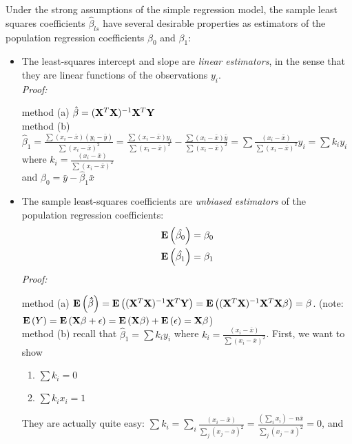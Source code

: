 Under the strong assumptions of the simple regression model, the sample least squares coefficients $\hat{\beta}_{ls}$ have several desirable properties as estimators of the population regression coefficients $\beta_0$ and $\beta_1$:
\begin{itemize}
  \item The least-squares intercept and slope are {\it linear estimators}, in the sense that they are linear functions of the observations $y_i$.
  \\
  {\it Proof:\\} 
  \begin{pf}
  method (a) $\hat{\beta} = (\mathbf{X}^T\mathbf{X})^{-1} \mathbf{X}^T\mathbf{Y}$\\
  method (b) $\hat{\beta}_1 =\frac{\sum(x_i - \bar{x})(y_i - \bar{y})}{\sum(x_i - \bar{x})^2} =\frac{\sum(x_i - \bar{x})y_i}{\sum(x_i - \bar{x})^2} - \frac{\sum(x_i - \bar{x})\bar{y}}{\sum(x_i - \bar{x})^2} = \sum\frac{(x_i - \bar{x})}{\sum(x_i - \bar{x})^2}y_i = \sum k_i y_i$ where $k_i = \frac{(x_i - \bar{x})}{\sum(x_i - \bar{x})^2}$\\
  and $\hat{\beta}_0 = \bar{y} - \hat{\beta}_1 \bar{x}$
  \end{pf}
  \item The sample least-squares coefficients are {\it unbiased estimators} of the population regression coefficients:
  $$
  \begin{aligned}
  {\mathbf{E}\left(\hat{\beta_0}\right)} &= \beta_0\\
  {\mathbf{E}\left(\hat{\beta_1}\right)} &= \beta_1\\  
  \end{aligned}
  $$
  {\it Proof:} \\
  \begin{pf}
  method (a) ${\mathbf{E}\left(\mathbf{\hat{\beta}}\right)} = {\mathbf{E}\left((\mathbf{X}^T\mathbf{X})^{-1} \mathbf{X}^T\mathbf{Y}\right)} = {\mathbf{E}\left((\mathbf{X}^T\mathbf{X})^{-1} \mathbf{X}^T\mathbf{X\beta}\right)} = \mathbf{\beta}$.  (note: ${\mathbf{E}\left(Y\right)} = {\mathbf{E}\left(\mathbf{X\beta} + \mathbf{\epsilon}\right)} = {\mathbf{E}\left(\mathbf{X\beta}\right)} + {\mathbf{E}\left(\mathbf{\epsilon}\right)} = \mathbf{X\beta}$)\\
  method (b) recall that $\hat{\beta}_1 =\sum k_i y_i$ where $k_i = \frac{(x_i - \bar{x})}{\sum(x_i - \bar{x})^2}$.  First, we want to show
  \begin{enumerate}
    \item $\sum k_i = 0$
    \item $\sum k_i x_i = 1$
  \end{enumerate}
  They are actually quite easy:  $\sum k_i = \sum_i \frac{(x_i - \bar{x})}{\sum_j (x_j - \bar{x})^2} = \frac{(\sum_i x_i) - n\bar{x}}{\sum_j(x_j - \bar{x})^2} = 0$, and 

\end{pf}
\end{itemize}
